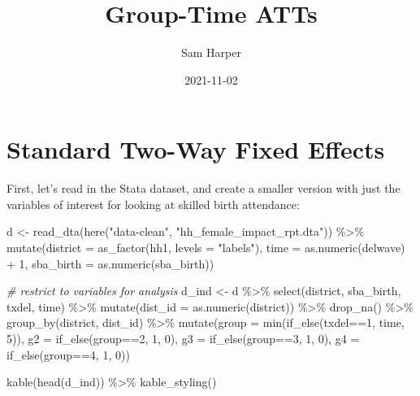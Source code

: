 \documentclass[
]{article}
\title{Group-Time ATTs}
\author{Sam Harper}
\date{2021-11-02}
\newenvironment{Shaded}{\begin{snugshade}}{\end{snugshade}}
\newcommand{\AttributeTok}[1]{\textcolor[rgb]{0.77,0.63,0.00}{#1}}
\newcommand{\CommentTok}[1]{\textcolor[rgb]{0.56,0.35,0.01}{\textit{#1}}}
\newcommand{\DecValTok}[1]{\textcolor[rgb]{0.00,0.00,0.81}{#1}}
\newcommand{\FunctionTok}[1]{\textcolor[rgb]{0.00,0.00,0.00}{#1}}
\newcommand{\NormalTok}[1]{#1}
\newcommand{\OtherTok}[1]{\textcolor[rgb]{0.56,0.35,0.01}{#1}}
\newcommand{\SpecialCharTok}[1]{\textcolor[rgb]{0.00,0.00,0.00}{#1}}
\newcommand{\StringTok}[1]{\textcolor[rgb]{0.31,0.60,0.02}{#1}}
\begin{document}
\maketitle

\hypertarget{standard-two-way-fixed-effects}{%
\section{Standard Two-Way Fixed
Effects}\label{standard-two-way-fixed-effects}}

First, let's read in the Stata dataset, and create a smaller version
with just the variables of interest for looking at skilled birth
attendance:

\begin{Shaded}
\begin{Highlighting}[]
\NormalTok{d }\OtherTok{\textless{}{-}} \FunctionTok{read\_dta}\NormalTok{(}\FunctionTok{here}\NormalTok{(}\StringTok{"data{-}clean"}\NormalTok{, }\StringTok{"hh\_female\_impact\_rpt.dta"}\NormalTok{)) }\SpecialCharTok{\%\textgreater{}\%}
    \FunctionTok{mutate}\NormalTok{(}\AttributeTok{district =} \FunctionTok{as\_factor}\NormalTok{(hh1, }\AttributeTok{levels =} \StringTok{"labels"}\NormalTok{),}
         \AttributeTok{time =} \FunctionTok{as.numeric}\NormalTok{(delwave) }\SpecialCharTok{+} \DecValTok{1}\NormalTok{,}
         \AttributeTok{sba\_birth =} \FunctionTok{as.numeric}\NormalTok{(sba\_birth))}

\CommentTok{\# restrict to variables for analysis}
\NormalTok{d\_ind }\OtherTok{\textless{}{-}}\NormalTok{ d }\SpecialCharTok{\%\textgreater{}\%} 
  \FunctionTok{select}\NormalTok{(district, sba\_birth, txdel, time) }\SpecialCharTok{\%\textgreater{}\%}
  \FunctionTok{mutate}\NormalTok{(}\AttributeTok{dist\_id =} \FunctionTok{as.numeric}\NormalTok{(district)) }\SpecialCharTok{\%\textgreater{}\%}
  \FunctionTok{drop\_na}\NormalTok{() }\SpecialCharTok{\%\textgreater{}\%}
  \FunctionTok{group\_by}\NormalTok{(district, dist\_id) }\SpecialCharTok{\%\textgreater{}\%}
  \FunctionTok{mutate}\NormalTok{(}\AttributeTok{group =} \FunctionTok{min}\NormalTok{(}\FunctionTok{if\_else}\NormalTok{(txdel}\SpecialCharTok{==}\DecValTok{1}\NormalTok{, time, }\DecValTok{5}\NormalTok{)),}
         \AttributeTok{g2 =} \FunctionTok{if\_else}\NormalTok{(group}\SpecialCharTok{==}\DecValTok{2}\NormalTok{, }\DecValTok{1}\NormalTok{, }\DecValTok{0}\NormalTok{),}
         \AttributeTok{g3 =} \FunctionTok{if\_else}\NormalTok{(group}\SpecialCharTok{==}\DecValTok{3}\NormalTok{, }\DecValTok{1}\NormalTok{, }\DecValTok{0}\NormalTok{),}
         \AttributeTok{g4 =} \FunctionTok{if\_else}\NormalTok{(group}\SpecialCharTok{==}\DecValTok{4}\NormalTok{, }\DecValTok{1}\NormalTok{, }\DecValTok{0}\NormalTok{)) }

\FunctionTok{kable}\NormalTok{(}\FunctionTok{head}\NormalTok{(d\_ind)) }\SpecialCharTok{\%\textgreater{}\%}
  \FunctionTok{kable\_styling}\NormalTok{()}
\end{Highlighting}
\end{Shaded}
\end{document}
